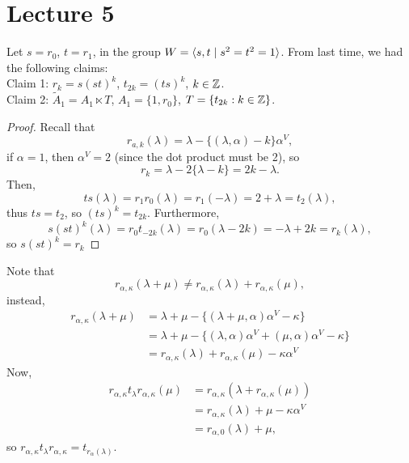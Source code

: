 \section{Lecture 5}


Let $s = r_0$, $t = r_1$, in the group $W = \langle s, t \mid s^2 = t^2 = 1 \rangle$.
From last time, we had the following claims:
\\

\noindent
Claim 1: $r_k = s(st)^k$, $t_{2k} = (ts)^k$, $k \in \mathbb{Z}$.
\\

\noindent
Claim 2: $\tilde{A}_1 = A_1 \ltimes T$, $A_1 = \{1, r_0\}$, $T = \{t_{2k} : k \in
\mathbb{Z}\}$.
\\

\begin{proof}
Recall that
\[ r_{a,k}(\lambda) = \lambda - \{(\lambda, \alpha) - k\} \alpha^V, \]
if $\alpha = 1$, then $\alpha^V = 2$ (since the dot product must be 2), so
\[
    r_{k} = \lambda - 2 \{\lambda-k\} = 2k-\lambda.
\]
Then,
\[
    ts(\lambda) = r_1 r_0(\lambda) = r_1(-\lambda) = 2+\lambda = t_2(\lambda),
\]
thus $ts = t_2$, so $(ts)^k = t_{2k}$. Furthermore,
\[
    s(st)^k(\lambda) = r_0 t_{-2k}(\lambda) = r_0(\lambda-2k) = -\lambda + 2k = r_k(\lambda),
\]
so $s(st)^k = r_k$
\end{proof}

Note that
\[
    r_{\alpha,\kappa}(\lambda + \mu) \neq r_{\alpha,\kappa}(\lambda)
    + r_{\alpha,\kappa}(\mu),
\]
instead,
\begin{align*}
    r_{\alpha, \kappa} (\lambda+\mu)
    &= \lambda + \mu - \{(\lambda + \mu, \alpha) \alpha^V - \kappa\} \\
    &= \lambda + \mu - \{(\lambda, \alpha) \alpha^V + (\mu, \alpha) \alpha^V - \kappa\} \\
    &= r_{\alpha,\kappa}(\lambda) + r_{\alpha, \kappa}(\mu) - \kappa \alpha^V
\end{align*}
Now,
\begin{align*}
    r_{\alpha,\kappa} t_{\lambda} r_{\alpha, \kappa}(\mu)
    &= r_{\alpha, \kappa}(\lambda + r_{\alpha, \kappa}(\mu)) \\
    &= r_{\alpha, \kappa}(\lambda) + \mu - \kappa \alpha^V \\
    &= r_{\alpha,0}(\lambda) + \mu,
\end{align*}
so $r_{\alpha, \kappa} t_\lambda r_{\alpha, \kappa} = t_{r_\alpha(\lambda)}$.
\\

